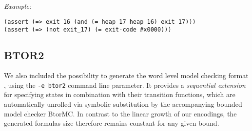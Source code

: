 \noindent
\emph{Example:} 

\begin{lstlisting}[style=smtlib]
(assert (=> exit_16 (and (= heap_17 heap_16) exit_17)))
(assert (=> (not exit_17) (= exit-code #x0000)))
\end{lstlisting}

\subsection{BTOR2}

We also included the possibility to generate the word level model checking format {\BTOR} \cite{ref:BTOR2}, using the \texttt{-e btor2} command line parameter.
It provides a \emph{sequential extension} for specifying %
states in combination with their transition functions,
which are automatically unrolled via symbolic substitution by the accompanying bounded model checker BtorMC.
In contrast to the linear growth of our {\SMTLIB} encodings, the generated formulas size therefore remains constant for any given bound. %
